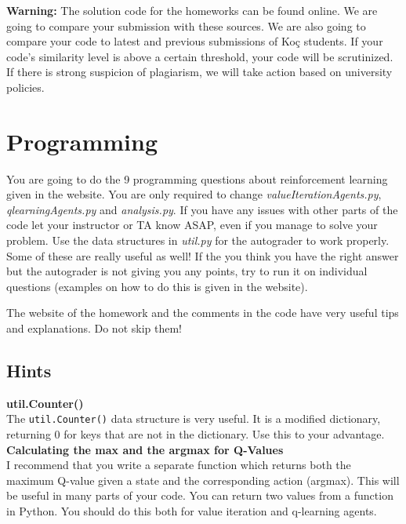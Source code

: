 \documentclass{article}
\newcommand{\coursePart}{reinforcement learning }
\begin{document}
\textbf{Warning:} The solution code for the homeworks can be found online. We are going to compare your submission with these sources. We are also going to 
compare your code to latest and previous submissions of Ko\c{c} students. If your code's similarity level is above a certain threshold, your code will be
scrutinized. If there is strong suspicion of plagiarism, we will take action based on university policies. 

\section*{Programming}
You are going to do the 9 programming questions about \coursePart given in the website.
You are only required to change \textit{valueIterationAgents.py}, \textit{qlearningAgents.py} and \textit{analysis.py}.  If you have any issues with other
parts of the code let your instructor or TA know ASAP, even if you manage to solve your problem.  Use
the data structures in \textit{util.py} for the autograder to work properly. Some of these are really useful as well! If the you think you have the right
answer but the autograder is not giving you any points, try to run it on individual questions (examples on how to do this is given in the website).

The website of the homework and the comments in the code have very useful tips and explanations. Do not skip them!

\subsection*{Hints}

\noindent
\textbf{util.Counter()} \\
The \texttt{util.Counter()} data structure is very useful. It is a modified dictionary, returning 0 for keys that are not in the dictionary. Use this to your
advantage. \\

\noindent
\textbf{Calculating the max and the argmax for Q-Values} \\
I recommend that you write a separate function which returns both the maximum Q-value given a state and the corresponding action (argmax). 
This will be useful in many parts of your code. You can return two values from a function in Python. 
You should do this both for value iteration and q-learning agents. \\
\end{document}
